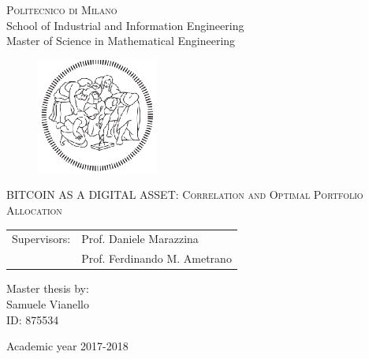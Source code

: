 \begin{titlepage}

	\begin{center}
		\normalsize 
			\textsc{Politecnico di Milano}\\
			School of Industrial and Information Engineering\\
			Master of Science in Mathematical Engineering\\

	\end{center}
	\vspace{.6cm}
	
	\begin{figure}[htpb]
		\centering
		\includegraphics[width=4cm]{Cover/polimi}
	\end{figure}
	\vspace{.6cm}
	
	\begin{center}
		\LARGE
			\textsc{BITCOIN AS A DIGITAL ASSET: Correlation and Optimal Portfolio Allocation}
	\end{center}
	\vspace{1.6cm}

	\begin{flushleft}
		\large
		\begin{tabular}{ll}
		Supervisors:    & Prof. Daniele Marazzina      \\
		             		   & Prof. Ferdinando M. Ametrano
		\end{tabular}
		\vspace{1cm}
	\end{flushleft}
	
	\begin{flushright}
		\large
		Master thesis by:\\
		Samuele Vianello\\
		ID: 875534\\		
	\end{flushright}
	
	\vspace*{\fill}
	\begin{center}
		Academic year 2017-2018
	\end{center}
	
\end{titlepage}
